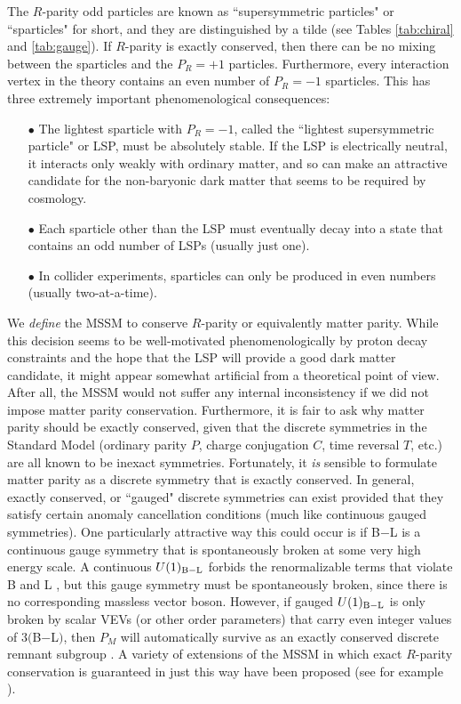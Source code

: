 \documentclass[12pt]{article}
\def\Baryon{{\rm B}}
\def\Lepton{{\rm L}}
\begin{document}
The $R$-parity odd particles are known as ``supersymmetric particles" or
``sparticles" for short, and they are distinguished by a tilde (see Tables
\ref{tab:chiral} and \ref{tab:gauge}). 
If $R$-parity is exactly conserved, then there can be no mixing
between the sparticles and the $P_R=+1$ particles. Furthermore, every
interaction vertex in the theory contains an even number of $P_R=-1$
sparticles. This has three extremely important phenomenological
consequences:
\begin{itemize}
\item[$\bullet$] The lightest sparticle with $P_R=-1$, called the
``lightest supersymmetric particle" or LSP, must be absolutely stable. If
the LSP is electrically neutral, it interacts only weakly with ordinary
matter, and so can make an attractive candidate \cite{neutralinodarkmatter} 
for the non-baryonic dark matter that seems to be required by cosmology.
%
\item[$\bullet$] Each sparticle other than the LSP must eventually decay
into a state that contains an odd number of LSPs (usually just one).
%
\item[$\bullet$] In collider experiments, sparticles can only be produced
in even numbers (usually two-at-a-time).
\end{itemize}

We {\it define} the MSSM to conserve $R$-parity or equivalently matter
parity. While this decision seems to be well-motivated phenomenologically
by proton decay constraints and the hope that the LSP will provide a good
dark matter candidate, it might appear somewhat artificial from a
theoretical point of view. After all, the MSSM would not suffer any
internal inconsistency if we did not impose matter parity conservation.
Furthermore, it is fair to ask why matter parity should be exactly
conserved, given that the discrete symmetries in the Standard Model
(ordinary parity $P$, charge conjugation $C$, time reversal $T$, etc.) are
all known to be inexact symmetries. Fortunately, it {\it is} sensible to
formulate matter parity as a discrete symmetry that is exactly conserved.
In general, exactly conserved, or ``gauged" discrete symmetries \cite{KW}
can exist provided that they satisfy certain anomaly cancellation
conditions \cite{discreteanomaly} (much like continuous gauged
symmetries). One particularly attractive way this could occur is if B$-$L
is a continuous gauge symmetry that is spontaneously broken at some
very high energy scale. A continuous $U(1)_{\Baryon-\Lepton}$
forbids the renormalizable terms that violate B and L 
\cite{Rparityoriginone,Rparityorigintwo},
but this gauge symmetry must be spontaneously broken, since there
is no corresponding massless vector boson.
However, if gauged $U(1)_{\Baryon - \Lepton}$ is only broken
by scalar VEVs (or other order parameters) that carry even integer
values of $3($B$-$L$)$, then $P_M$ will automatically survive as an
exactly conserved discrete remnant subgroup \cite{Rparityorigintwo}. 
A variety of extensions of the MSSM in which exact $R$-parity 
conservation is guaranteed in just this way have been proposed
(see for example \cite{Rparityorigintwo,Rparityoriginthree}). 
\end{document}
